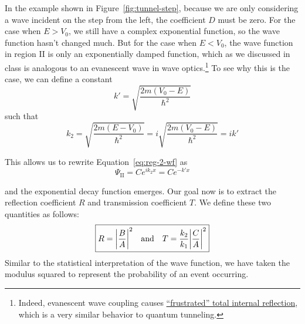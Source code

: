 In the example shown in Figure~\ref{fig:tunnel-step}, because we are only considering a wave incident on the step from the left, the coefficient $D$ must be zero. For the case when $E > V_0$, we still have a complex exponential function, so the wave function hasn't changed much. But for the case when $E < V_0$, the wave function in region II is only an exponentially damped function, which as we discussed in class is analogous to an evanescent wave in wave optics.\footnote{Indeed, evanescent wave coupling causes \href{https://en.wikipedia.org/wiki/Total_internal_reflection\#Frustrated_total_internal_reflection}{``frustrated'' total internal reflection}, which is a very similar behavior to quantum tunneling.} To see why this is the case, we can define a constant
\begin{equation}
	k' = \sqrt{\frac{2m(V_0-E)}{\hbar^2}} \label{eq:reg-2-kp}
\end{equation}
such that
\begin{equation*}
	k_2 = \sqrt{\frac{2m(E-V_0)}{\hbar^2}} = i\sqrt{\frac{2m(V_0-E)}{\hbar^2}} = ik'
\end{equation*}

This allows us to rewrite Equation~\ref{eq:reg-2-wf} as 
\begin{equation}
	\Psi_{\text{II}} = Ce^{ik_2x} = Ce^{-k'x} \label{eq:reg-2-wfp}
\end{equation}

and the exponential decay function emerges. Our goal now is to extract the reflection coefficient $R$ and transmission coefficient $T$. We define these two quantities as follows:
\begin{equation*}
	\boxed{R = \abs{\frac{B}{A}}^2 \quad \text{and} \quad T = \frac{k_2}{k_1}\abs{\frac{C}{A}}^2}
\end{equation*}
Similar to the statistical interpretation of the wave function, we have taken the modulus squared to represent the probability of an event occurring. \par 


